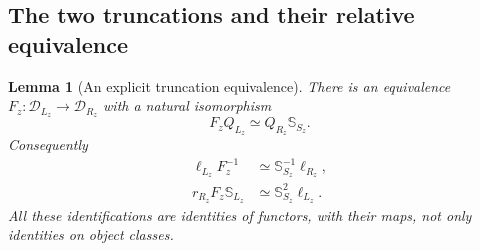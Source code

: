 \documentclass[11pt]{article}
\newtheorem{lemma}[theorem]{Lemma}
\theoremstyle{definition}
\begin{document}
\subsection{The two truncations and their relative equivalence}
\begin{lemma}[An explicit truncation equivalence]\label{lem:truncation}
There is an equivalence $F_z:\mathcal D_{L_z}\to\mathcal D_{R_z}$
with a natural isomorphism
\begin{equation}\label{eq:relative-F}
 F_z Q_{L_z}\simeq Q_{R_z}\mathbb S_{S_z}.
\end{equation}
Consequently
\begin{align}
 \ell_{L_z}F_z^{-1}&\simeq\mathbb S_{S_z}^{-1}\ell_{R_z},
       \label{eq:F-left}\\
 r_{R_z}F_z\mathbb S_{L_z}&\simeq
             \mathbb S_{S_z}^{2}\ell_{L_z}.
       \label{eq:F-right}
\end{align}
All these identifications are identities of functors, with their
maps, not only identities on object classes.
\end{lemma}
\end{document}
